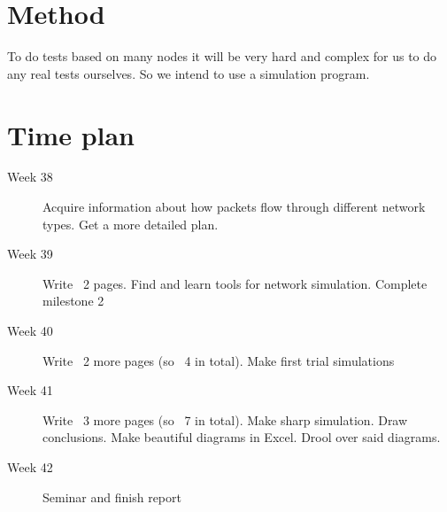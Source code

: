 \documentclass[11pt,twocolumn]{article}
\begin{document}
\section{Method}

To do tests based on many nodes it will be very hard and complex for us to do any real tests ourselves. So we intend to use a simulation program.

\section{Time plan}
\begin{description}
\item[Week 38]
Acquire information about how packets flow through different network types. Get a more detailed plan.
\item[Week 39]
Write ~2 pages. Find and learn tools for network simulation. Complete milestone 2
\item[Week 40]
Write ~2 more pages (so ~4 in total). Make first trial simulations
\item[Week 41]
Write ~3 more pages (so ~7 in total). Make sharp simulation. Draw conclusions. Make beautiful diagrams in Excel. Drool over said diagrams.
\item[Week 42]
Seminar and finish report
\end{description}
\end{document}

